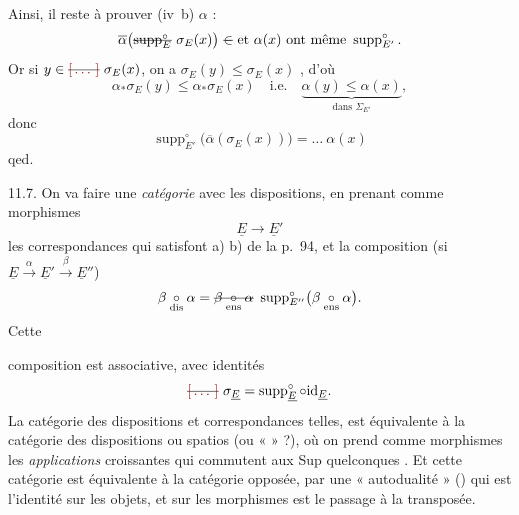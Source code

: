 \documentclass[11pt,a4paper]{article}
\begin{document}
Ainsi, il reste à prouver (iv~b)  $\alpha$ :
\[
  \overline{\alpha}\bigl(\text{\struck{$\operatorname{supp}^{\circ}_E$}}\ \sigma_E(x)\bigr) \text{ \struck{$\in$} et } \alpha(x) \text{ ont même } \operatorname{supp}^{\circ}_{E'} .
\]
Or si $y \in \text{\struck{\ill{}}}\ \sigma_E(x)$, on a $\sigma_E(y) \leq \sigma_E(x)$
,
d'où \struck{$\alpha_{*}(\ldots)$}
\[
  \alpha_{*}\sigma_E(y) \leq \alpha_{*}\sigma_E(x)
  \quad \text{i.e.} \quad
  \underbrace{\alpha(y) \leq \alpha(x)}_{\text{dans } \Sigma_{E'}} ,
\]
donc 
\[
  \operatorname{supp}^{\circ}_{E'}\bigl(\overline{\alpha}(\sigma_E(x))\bigr) = \ldots\ \alpha(x)
\]
 qed.

11.7. On va faire une \emph{catégorie} avec les dispositions, en prenant comme morphismes
\[
  \underline{E} \longrightarrow \underline{E}'
\]
les correspondances qui satisfont a) b) de la p.~94, et la composition (si $\underline{E} \xrightarrow{\ \alpha\ } \underline{E}' \xrightarrow{\ \beta\ } \underline{E}''$)
\[
  \beta \underset{\text{dis}}{\circ} \alpha = \text{\struck{$\beta \underset{\text{ens}}{\circ} \alpha$}}\ \operatorname{supp}^{\circ}_{E''}\bigl(\beta \underset{\text{ens}}{\circ} \alpha\bigr) .
\]
Cette


composition est associative, avec   identités
\[
  \text{\struck{\ill{}}}\ \sigma_{\underline{E}} = \operatorname{supp}^{\circ}_{\underline{E}} \circ \mathrm{id}_{\underline{E}} .
\]
La catégorie des dispositions et correspondances   telles, est équivalente à la catégorie des dispositions  ou spatios (ou «  » ?), où on prend comme morphismes les \emph{applications} croissantes qui commutent aux Sup quelconques . Et cette catégorie est  équivalente à la catégorie opposée, par une « autodualité » () qui est l'identité sur les objets, et sur les morphismes est le passage à la  transposée.
\end{document}
